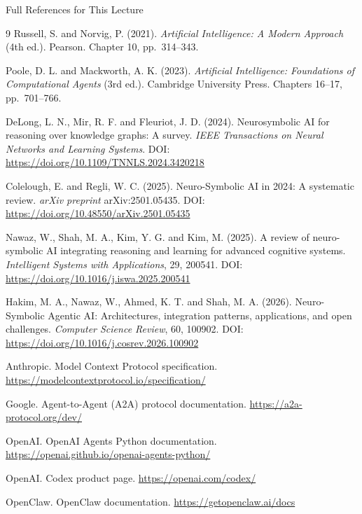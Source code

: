 \documentclass[aspectratio=169]{beamer}
\newcommand{\defaultdeckrefs}{AIMA4e Ch.10 pp.314--343; Poole3e Ch.16--17 pp.701--766; doi:10.1016/j.cosrev.2026.100902}
\newcommand{\currentsliderefs}{\defaultdeckrefs}
\newcommand{\setslideref}[1]{\gdef\currentsliderefs{#1}}
\begin{document}
\setslideref{Full references listed on this slide}
\begin{frame}[allowframebreaks]{Full References for This Lecture}
\footnotesize
\begin{thebibliography}{9}
Russell, S. and Norvig, P. (2021).
\newblock \textit{Artificial Intelligence: A Modern Approach} (4th ed.).
\newblock Pearson. Chapter 10, pp.~314--343.

Poole, D. L. and Mackworth, A. K. (2023).
\newblock \textit{Artificial Intelligence: Foundations of Computational Agents} (3rd ed.).
\newblock Cambridge University Press. Chapters 16--17, pp.~701--766.

DeLong, L. N., Mir, R. F. and Fleuriot, J. D. (2024).
\newblock Neurosymbolic AI for reasoning over knowledge graphs: A survey.
\newblock \textit{IEEE Transactions on Neural Networks and Learning Systems}.
\newblock DOI: \url{https://doi.org/10.1109/TNNLS.2024.3420218}

Colelough, E. and Regli, W. C. (2025).
\newblock Neuro-Symbolic AI in 2024: A systematic review.
\newblock \textit{arXiv preprint} arXiv:2501.05435.
\newblock DOI: \url{https://doi.org/10.48550/arXiv.2501.05435}

Nawaz, W., Shah, M. A., Kim, Y. G. and Kim, M. (2025).
\newblock A review of neuro-symbolic AI integrating reasoning and learning for advanced cognitive systems.
\newblock \textit{Intelligent Systems with Applications}, 29, 200541.
\newblock DOI: \url{https://doi.org/10.1016/j.iswa.2025.200541}

Hakim, M. A., Nawaz, W., Ahmed, K. T. and Shah, M. A. (2026).
\newblock Neuro-Symbolic Agentic AI: Architectures, integration patterns, applications, and open challenges.
\newblock \textit{Computer Science Review}, 60, 100902.
\newblock DOI: \url{https://doi.org/10.1016/j.cosrev.2026.100902}

Anthropic.
\newblock Model Context Protocol specification.
\newblock \url{https://modelcontextprotocol.io/specification/}

Google.
\newblock Agent-to-Agent (A2A) protocol documentation.
\newblock \url{https://a2a-protocol.org/dev/}

OpenAI.
\newblock OpenAI Agents Python documentation.
\newblock \url{https://openai.github.io/openai-agents-python/}

OpenAI.
\newblock Codex product page.
\newblock \url{https://openai.com/codex/}

OpenClaw.
\newblock OpenClaw documentation.
\newblock \url{https://getopenclaw.ai/docs}
\end{thebibliography}
\end{frame}
\end{document}
